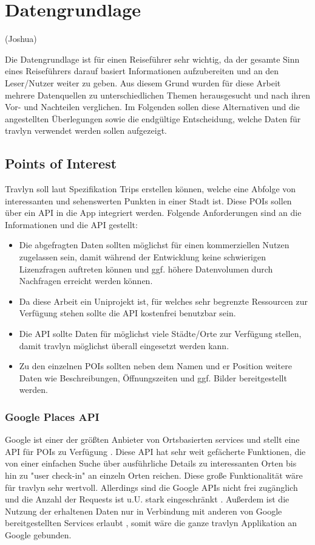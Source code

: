 \chapter{Datengrundlage}
(Joshua)

Die Datengrundlage ist für einen Reiseführer sehr wichtig, da der gesamte Sinn eines Reiseführers darauf basiert Informationen aufzubereiten und an den Leser/Nutzer weiter zu geben. Aus diesem Grund wurden für diese Arbeit mehrere Datenquellen zu unterschiedlichen Themen herausgesucht und nach ihren Vor- und Nachteilen verglichen. Im Folgenden sollen diese Alternativen und die angestellten Überlegungen sowie die endgültige Entscheidung, welche Daten für travlyn verwendet werden sollen aufgezeigt.

\section{Points of Interest}
Travlyn soll laut Spezifikation Trips erstellen können, welche eine Abfolge von interessanten und sehenswerten Punkten in einer Stadt ist. Diese \ac{POIs} sollen über ein \ac{API} in die App integriert werden. Folgende Anforderungen sind an die Informationen und die API gestellt:

\begin{itemize}
	\item Die abgefragten Daten sollten möglichst für einen kommerziellen Nutzen zugelassen sein, damit während der Entwicklung keine schwierigen Lizenzfragen auftreten können und ggf. höhere Datenvolumen durch Nachfragen erreicht werden können.
	\item Da diese Arbeit ein Uniprojekt ist, für welches sehr begrenzte Ressourcen zur Verfügung stehen sollte die API kostenfrei benutzbar sein.  
	\item Die API sollte Daten für möglichst viele Städte/Orte zur Verfügung stellen, damit travlyn möglichst überall eingesetzt werden kann.
	\item Zu den einzelnen POIs sollten neben dem Namen und er Position weitere Daten wie Beschreibungen, Öffnungszeiten und ggf. Bilder bereitgestellt werden.
\end{itemize}

\subsection{Google Places API}
Google ist einer der größten Anbieter von Ortsbasierten services und stellt eine API für POIs zu Verfügung \cite{google2020}. Diese API hat sehr weit gefächerte Funktionen, die von einer einfachen Suche über ausführliche Details zu interessanten Orten bis hin zu "user check-in" an einzeln Orten reichen. Diese große Funktionalität wäre für travlyn sehr wertvoll. Allerdings sind die Google APIs nicht frei zugänglich und die Anzahl der Requests ist u.U. stark eingeschränkt \cite{singhal2012implementation}. Außerdem ist die Nutzung der erhaltenen Daten nur in Verbindung mit anderen von Google bereitgestellten Services erlaubt \cite{googleTerms2020}, somit wäre die ganze travlyn Applikation an Google gebunden.  


